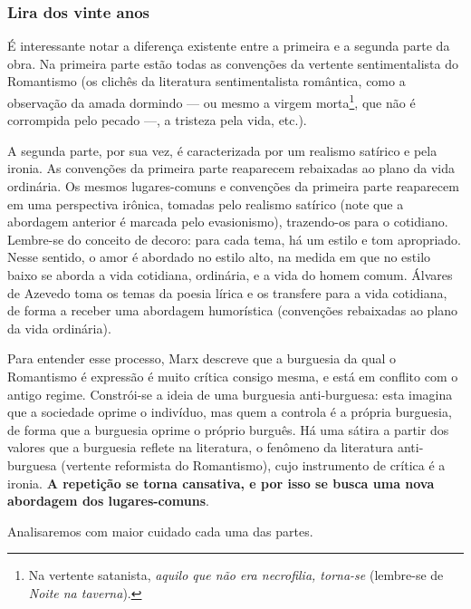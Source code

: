\documentclass[12pt]{book}
\begin{document}
					\subsubsection{Lira dos vinte anos}
					\par É interessante notar a diferença existente entre a primeira e a segunda parte da obra. Na primeira parte estão todas as convenções da vertente sentimentalista do Romantismo (os clichês da literatura sentimentalista romântica, como a observação da amada dormindo — ou mesmo a virgem morta\footnote{Na vertente satanista, \textit{aquilo que não era necrofilia, torna-se} (lembre-se de \textit{Noite na taverna}).}, que não é corrompida pelo pecado —, a tristeza pela vida, etc.).
					\par A segunda parte, por sua vez, é caracterizada por um realismo satírico e pela ironia. As convenções da primeira parte reaparecem rebaixadas ao plano da vida ordinária. Os mesmos lugares-comuns e convenções da primeira parte reaparecem em uma perspectiva irônica, tomadas pelo realismo satírico (note que a abordagem anterior é marcada pelo evasionismo), trazendo-os para o cotidiano. Lembre-se do conceito de decoro: para cada tema, há um estilo e tom apropriado. Nesse sentido, o amor é abordado no estilo alto, na medida em que no estilo baixo se aborda a vida cotidiana, ordinária, e a vida do homem comum. Álvares de Azevedo toma os temas da poesia lírica e os transfere para a vida cotidiana, de forma a receber uma abordagem humorística (convenções rebaixadas ao plano da vida ordinária).
					\par Para entender esse processo, Marx descreve que a burguesia da qual o Romantismo é expressão é muito crítica consigo mesma, e está em conflito com o antigo regime. Constrói-se a ideia de uma burguesia anti-burguesa: esta imagina que a sociedade oprime o indivíduo, mas quem a controla é a própria burguesia, de forma que a burguesia oprime o próprio burguês. Há uma sátira a partir dos valores que a burguesia reflete na literatura, o fenômeno da literatura anti-burguesa (vertente reformista do Romantismo), cujo instrumento de crítica é a ironia. \textbf{A repetição se torna cansativa, e por isso se busca uma nova abordagem dos lugares-comuns}.
					\par Analisaremos com maior cuidado cada uma das partes.
					\settowidth{\versewidth}{Do sonho nas melodias,}
\end{document}
